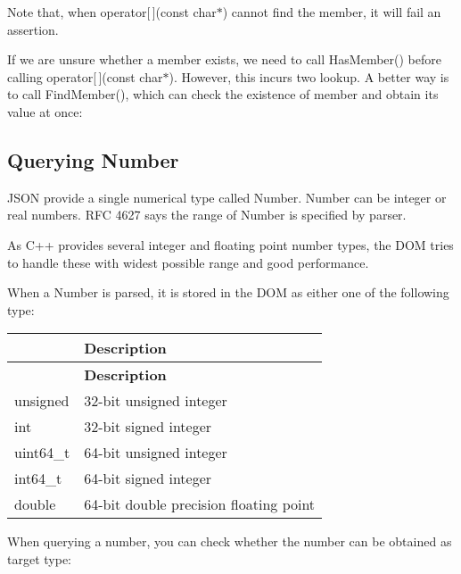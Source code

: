 Note that, when {\ttfamily operator\mbox{[}$\,$\mbox{]}(const char$\ast$)} cannot find the member, it will fail an assertion.

If we are unsure whether a member exists, we need to call {\ttfamily Has\+Member()} before calling {\ttfamily operator\mbox{[}$\,$\mbox{]}(const char$\ast$)}. However, this incurs two lookup. A better way is to call {\ttfamily Find\+Member()}, which can check the existence of member and obtain its value at once\+:


\hypertarget{md_Commun_Externe_RapidJSON_doc_tutorial.zh-cn_QueryNumber}{}\subsection{Querying Number}\label{md_Commun_Externe_RapidJSON_doc_tutorial.zh-cn_QueryNumber}
J\+S\+ON provide a single numerical type called Number. Number can be integer or real numbers. R\+FC 4627 says the range of Number is specified by parser.

As C++ provides several integer and floating point number types, the D\+OM tries to handle these with widest possible range and good performance.

When a Number is parsed, it is stored in the D\+OM as either one of the following type\+:

\tabulinesep=1mm
\begin{longtabu} spread 0pt [c]{*2{|X[-1]}|}
\hline
{}&{\bf Description  }\\
\endfirsthead
\hline
\endfoot
\hline
{}&{\bf Description  }\\
\endhead
{\ttfamily unsigned} &32-\/bit unsigned integer \\
{\ttfamily int} &32-\/bit signed integer \\
{\ttfamily uint64\+\_\+t} &64-\/bit unsigned integer \\
{\ttfamily int64\+\_\+t} &64-\/bit signed integer \\
{\ttfamily double} &64-\/bit double precision floating point \\
\end{longtabu}
When querying a number, you can check whether the number can be obtained as target type\+:

